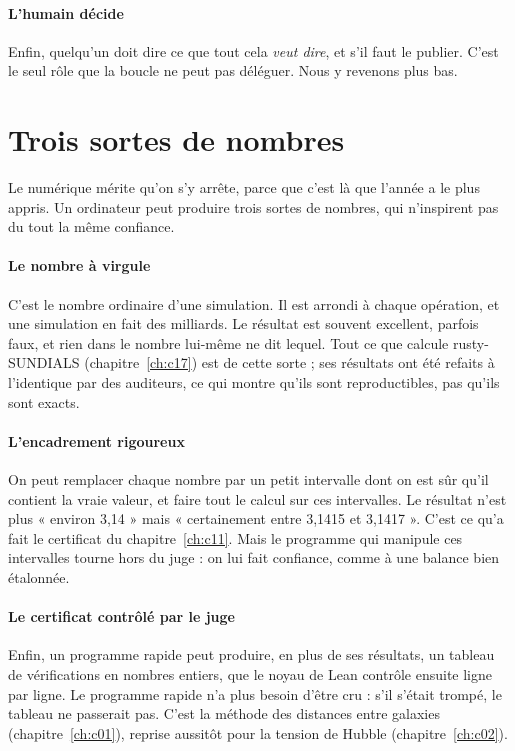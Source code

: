 \paragraph{L'humain décide} Enfin, quelqu'un doit dire ce que tout cela \emph{veut dire}, et s'il faut le publier.
C'est le seul rôle que la boucle ne peut pas déléguer. Nous y revenons plus bas.

\section{Trois sortes de nombres}

Le numérique mérite qu'on s'y arrête, parce que c'est là que l'année a le plus appris. Un ordinateur peut produire
trois sortes de nombres, qui n'inspirent pas du tout la même confiance.

\paragraph{Le nombre à virgule } C'est le nombre ordinaire d'une simulation. Il est arrondi à chaque
opération, et une simulation en fait des milliards. Le résultat est souvent excellent, parfois faux, et rien dans le
nombre lui-même ne dit lequel. Tout ce que calcule rusty-SUNDIALS (chapitre~\ref{ch:c17}) est de cette sorte ; ses
résultats ont été refaits à l'identique par des auditeurs, ce qui montre qu'ils sont reproductibles, pas qu'ils sont
exacts.

\paragraph{L'encadrement rigoureux} On peut remplacer chaque nombre par un petit intervalle dont on est sûr qu'il
contient la vraie valeur, et faire tout le calcul sur ces intervalles. Le résultat n'est plus « environ 3,14 » mais
« certainement entre 3,1415 et 3,1417 ». C'est ce qu'a fait le certificat du chapitre~\ref{ch:c11}. Mais le programme qui manipule ces intervalles tourne hors du juge : on lui fait confiance, comme à
une balance bien étalonnée.

\paragraph{Le certificat contrôlé par le juge } Enfin, un programme rapide peut produire, en plus de ses
résultats, un tableau de vérifications en nombres entiers, que le noyau de Lean contrôle ensuite ligne par ligne. Le
programme rapide n'a plus besoin d'être cru : s'il s'était trompé, le tableau ne passerait pas. C'est la méthode des
distances entre galaxies (chapitre~\ref{ch:c01}), reprise aussitôt pour la tension de Hubble (chapitre~\ref{ch:c02}).

